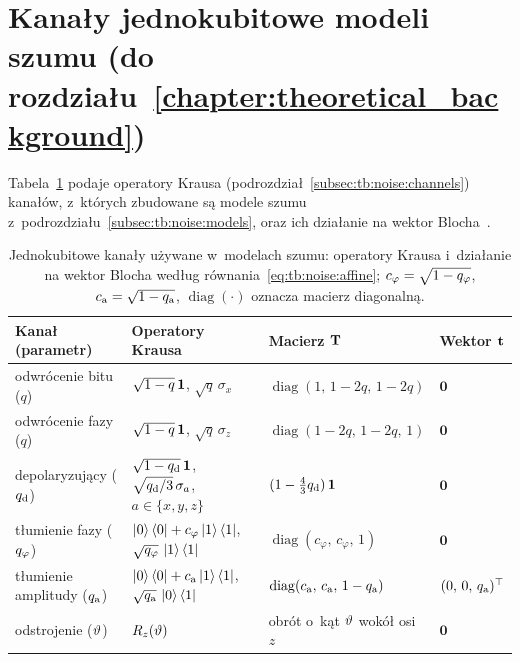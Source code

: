 
\section{Kanały jednokubitowe modeli szumu (do rozdziału~\ref{chapter:theoretical_background})}\label{app:results:tb}


Tabela~\ref{tab:tb:noise:channels} podaje operatory Krausa (podrozdział~\ref{subsec:tb:noise:channels}) kanałów, z~których zbudowane są modele szumu z~podrozdziału~\ref{subsec:tb:noise:models}, oraz ich działanie na wektor Blocha~\cite{NielsenChuang2010}.

\begin{table}[htb]
\centering
\caption[Jednokubitowe kanały używane w~modelach szumu]{Jednokubitowe kanały używane w~modelach szumu: operatory Krausa i~działanie na wektor Blocha według równania~\eqref{eq:tb:noise:affine}; $c_{\varphi}=\sqrt{1-q_{\varphi}}$, $c_{\mathrm{a}}=\sqrt{1-q_{\mathrm{a}}}$, $\operatorname{diag}(\cdot)$ oznacza macierz diagonalną.}
\label{tab:tb:noise:channels}
\footnotesize
\setlength{\tabcolsep}{4pt}
\begin{tabular}{@{}llll@{}}
\toprule
Kanał (parametr) & Operatory Krausa & Macierz $\mathbf{T}$ & Wektor $\mathbf{t}$ \\
\midrule
odwrócenie bitu ($q$) & $\sqrt{1-q}\,\mathbf{1}$, $\sqrt{q}\,\sigma_x$ & $\operatorname{diag}(1,\,1-2q,\,1-2q)$ & $\mathbf{0}$ \\
odwrócenie fazy ($q$) & $\sqrt{1-q}\,\mathbf{1}$, $\sqrt{q}\,\sigma_z$ & $\operatorname{diag}(1-2q,\,1-2q,\,1)$ & $\mathbf{0}$ \\
depolaryzujący ($q_{\mathrm{d}}$) & $\sqrt{1-q_{\mathrm{d}}}\,\mathbf{1}$, $\sqrt{q_{\mathrm{d}}/3}\,\sigma_{a}$, $a\in\{x,y,z\}$ & $(1-\tfrac{4}{3}q_{\mathrm{d}})\,\mathbf{1}$ & $\mathbf{0}$ \\
tłumienie fazy ($q_{\varphi}$) & $\ket{0}\bra{0}+c_{\varphi}\ket{1}\bra{1}$, $\sqrt{q_{\varphi}}\,\ket{1}\bra{1}$ & $\operatorname{diag}(c_{\varphi},\,c_{\varphi},\,1)$ & $\mathbf{0}$ \\
tłumienie amplitudy ($q_{\mathrm{a}}$) & $\ket{0}\bra{0}+c_{\mathrm{a}}\ket{1}\bra{1}$, $\sqrt{q_{\mathrm{a}}}\,\ket{0}\bra{1}$ & $\operatorname{diag}(c_{\mathrm{a}},\,c_{\mathrm{a}},\,1-q_{\mathrm{a}})$ & $(0,\,0,\,q_{\mathrm{a}})^{\top}$ \\
odstrojenie ($\vartheta$) & $R_z(\vartheta)$ & obrót o~kąt $\vartheta$ wokół osi $z$ & $\mathbf{0}$ \\
\bottomrule
\end{tabular}
\end{table}
